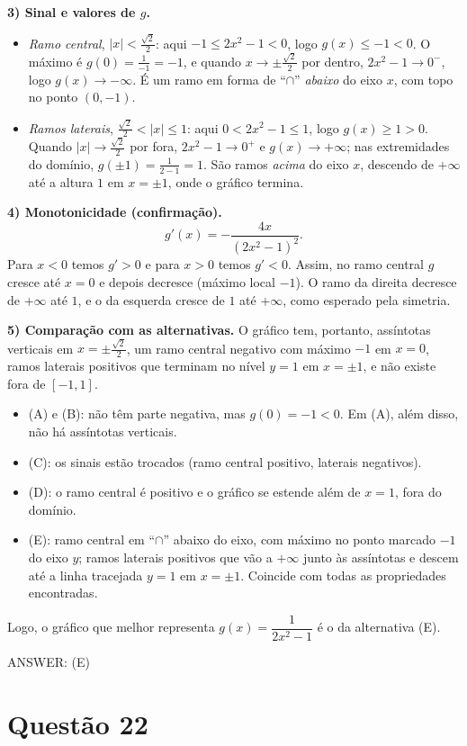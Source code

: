 \documentclass{article}%
\begin{document}
\textbf{3) Sinal e valores de $g$.}
\begin{itemize}
\item \emph{Ramo central}, $|x|<\frac{\sqrt2}{2}$: aqui $-1\le 2x^2-1<0$, logo $g(x)\le -1<0$. O máximo é $g(0)=\frac{1}{-1}=-1$, e quando $x\to\pm\frac{\sqrt2}{2}$ por dentro, $2x^2-1\to 0^-$, logo $g(x)\to-\infty$. É um ramo em forma de ``$\cap$'' \emph{abaixo} do eixo $x$, com topo no ponto $(0,-1)$.
\item \emph{Ramos laterais}, $\frac{\sqrt2}{2}<|x|\le 1$: aqui $0<2x^2-1\le 1$, logo $g(x)\ge 1>0$. Quando $|x|\to\frac{\sqrt2}{2}$ por fora, $2x^2-1\to0^+$ e $g(x)\to+\infty$; nas extremidades do domínio, $g(\pm1)=\frac{1}{2-1}=1$. São ramos \emph{acima} do eixo $x$, descendo de $+\infty$ até a altura $1$ em $x=\pm1$, onde o gráfico termina.
\end{itemize}

\textbf{4) Monotonicidade (confirmação).}
\[
g'(x)=-\frac{4x}{(2x^2-1)^2}.
\]
Para $x<0$ temos $g'>0$ e para $x>0$ temos $g'<0$. Assim, no ramo central $g$ cresce até $x=0$ e depois decresce (máximo local $-1$). O ramo da direita decresce de $+\infty$ até $1$, e o da esquerda cresce de $1$ até $+\infty$, como esperado pela simetria.

\textbf{5) Comparação com as alternativas.} O gráfico tem, portanto, assíntotas verticais em $x=\pm\frac{\sqrt2}{2}$, um ramo central negativo com máximo $-1$ em $x=0$, ramos laterais positivos que terminam no nível $y=1$ em $x=\pm1$, e não existe fora de $[-1,1]$.
\begin{itemize}
\item (A) e (B): não têm parte negativa, mas $g(0)=-1<0$. Em (A), além disso, não há assíntotas verticais.
\item (C): os sinais estão trocados (ramo central positivo, laterais negativos).
\item (D): o ramo central é positivo e o gráfico se estende além de $x=1$, fora do domínio.
\item (E): ramo central em ``$\cap$'' abaixo do eixo, com máximo no ponto marcado $-1$ do eixo $y$; ramos laterais positivos que vão a $+\infty$ junto às assíntotas e descem até a linha tracejada $y=1$ em $x=\pm1$. Coincide com todas as propriedades encontradas.
\end{itemize}

Logo, o gráfico que melhor representa $g(x)=\dfrac{1}{2x^2-1}$ é o da alternativa (E).

ANSWER: (E)%
\newpage%
\section*{Questão 22}
\end{document}
